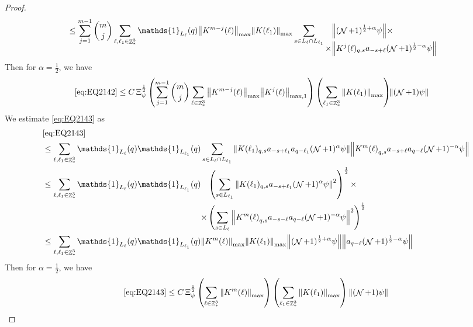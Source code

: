 \documentclass[sn-mathphys, Numbered ,a4paper]{sn-jnl}%
\DeclareMathOperator{\Z}{\mathbb{Z}}
\DeclareMathOperator{\NN}{\mathcal{N}}
\newcommand{\half}{\frac{1}{2}}
\theoremstyle{plain}
\theoremstyle{definition}
\theoremstyle{remark}
\theoremstyle{plain}
\theoremstyle{definition}
\theoremstyle{remark}
\begin{document}
{\begin{proof}
\begin{align}
			&\leq \sum\limits_{j=1}^{m-1} {{m}\choose j} \sum\limits_{\ell, \ell_1\in \Z^3_*} \mathds{1}_{L_{\ell}}(q) \norm{K^{m-j}(\ell)}_{\mathrm{max}} \norm{K(\ell_1)}_{\mathrm{max}}  \sum\limits_{s\in L_{\ell} \cap L_{\ell_1}} \begin{aligned}[t] &\norm{(\NN+1)^{\half+\alpha}\psi}\nonumber \times \\ \times&\norm{ K^j(\ell)_{q,s} a_{-s+\ell} (\NN+1)^{\half-\alpha} \psi }\end{aligned} \nonumber
		\end{align} 
		Then for $\alpha = \half$, we have
		\begin{align}
			\eqref{eq:EQ2142} &\leq  C \, \Xi_{\psi}^\half \left(  \sum\limits_{j=1}^{m-1} {{m}\choose j} \sum\limits_{\ell \in \Z^3_*} \norm{K^{m-j}(\ell)}_{\mathrm{max}} \norm{ K^{j}(\ell)}_{\mathrm{max,1}}\right) \left( \sum\limits_{ \ell_1\in \Z^3_*}\norm{ K(\ell_1) }_{\mathrm{max}} \right)\!\! \norm{(\NN+1) \psi }\label{eq:estEQ2142}
		\end{align}
		We estimate \eqref{eq:EQ2143} as 
		\begin{align}
			&\eqref{eq:EQ2143}\nonumber\\
			&\leq \sum\limits_{\ell, \ell_1\in \Z^3_*} \mathds{1}_{L_{\ell}}(q) \mathds{1}_{L_{\ell_1}}(q) \sum\limits_{ s \in L_{\ell} \cap L_{\ell_1}} \norm{K(\ell_1)_{q,s} a_{-s+\ell_1} a_{q-\ell_1}  (\NN+1)^{\alpha}\psi}\norm{ K^m{(\ell)}_{q,s}  a_{-s+\ell} a_{q-\ell} (\NN+1)^{-\alpha} \psi } \nonumber\\
			&\leq \sum\limits_{\ell, \ell_1\in \Z^3_*} \mathds{1}_{L_{\ell}}(q) \mathds{1}_{L_{\ell_1}}(q) \begin{aligned}[t]&\left(\sum\limits_{ s \in L_{\ell_1}} \norm{K(\ell_1)_{q,s} a_{-s+\ell_1} (\NN+1)^{\alpha}\psi}^2\right)^\half \times \nonumber\\ \times &\left( \sum\limits_{ s \in L_{\ell} } \norm{ K^m{(\ell)}_{q,s}  a_{-s-\ell} a_{q-\ell} (\NN+1)^{-\alpha} \psi }^2\right)^\half \end{aligned}\nonumber\\
			&\leq \sum\limits_{\ell, \ell_1\in \Z^3_*} \mathds{1}_{L_{\ell}}(q) \mathds{1}_{L_{\ell_1}}(q) \norm{K^m{(\ell)}}_{\mathrm{max}} \norm{K(\ell_1)}_{\mathrm{max}} \norm{   (\NN+1)^{\half+\alpha}\psi} \norm{ a_{q-\ell} (\NN+1)^{\half-\alpha} \psi } \nonumber
		\end{align} 
		Then for $\alpha = \half$, we have
		\begin{equation}
			\eqref{eq:EQ2143}\leq C\, \Xi_{\psi}^\half \left(\sum\limits_{\ell\in \Z^3_*} \norm{K^m(\ell)}_{\mathrm{max}}\right)\left(  \sum\limits_{ \ell_1\in \Z^3_*}  \norm{ K(\ell_1)}_{\mathrm{max}} \right) \norm{ (\NN+1) \psi}\label{eq:estEQ2143} 

\end{equation}
\end{proof}}
\end{document}
